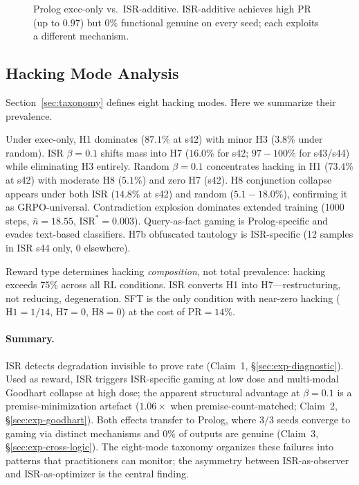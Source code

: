 \begin{figure}[t]
  \centering
  \caption{Prolog exec-only vs.\ ISR-additive. ISR-additive achieves high PR (up to $0.97$) but $0\%$ functional genuine on every seed; each exploits a different mechanism.}
  \label{fig:prolog-comparison}
\end{figure}

\subsection{Hacking Mode Analysis}
\label{sec:exp-hacking-analysis}

Section~\ref{sec:taxonomy} defines eight hacking modes.
Here we summarize their prevalence.

Under exec-only, H1 dominates ($87.1\%$ at s42) with minor H3 ($3.8\%$ under random).
ISR $\beta{=}0.1$ shifts mass into H7 ($16.0\%$ for s42; $97{-}100\%$ for s43/s44) while eliminating H3 entirely.
Random $\beta{=}0.1$ concentrates hacking in H1 ($73.4\%$ at s42) with moderate H8 ($5.1\%$) and zero H7 (s42).
H8 conjunction collapse appears under both ISR ($14.8\%$ at s42) and random ($5.1{-}18.0\%$), confirming it as GRPO-universal.
Contradiction explosion dominates extended training (1000 steps, $\bar{n}{=}18.55$, $\mathrm{ISR}^*{=}0.003$).
Query-as-fact gaming is Prolog-specific and evades text-based classifiers.
H7b obfuscated tautology is ISR-specific (12 samples in ISR s44 only, 0 elsewhere).

Reward type determines hacking \emph{composition}, not total prevalence: hacking exceeds $75\%$ across all RL conditions.
ISR converts H1 into H7---restructuring, not reducing, degeneration.
SFT is the only condition with near-zero hacking ($\mathrm{H1}{=}1/14$, $\mathrm{H7}{=}0$, $\mathrm{H8}{=}0$) at the cost of $\mathrm{PR}{=}14\%$.

\paragraph{Summary.}
ISR detects degradation invisible to prove rate (Claim~1, \S\ref{sec:exp-diagnostic}).
Used as reward, ISR triggers ISR-specific gaming at low dose and multi-modal Goodhart collapse at high dose; the apparent structural advantage at $\beta{=}0.1$ is a premise-minimization artefact ($1.06\times$ when premise-count-matched; Claim~2, \S\ref{sec:exp-goodhart}).
Both effects transfer to Prolog, where 3/3 seeds converge to gaming via distinct mechanisms and $0\%$ of outputs are genuine (Claim~3, \S\ref{sec:exp-cross-logic}).
The eight-mode taxonomy organizes these failures into patterns that practitioners can monitor; the asymmetry between ISR-as-observer and ISR-as-optimizer is the central finding.
